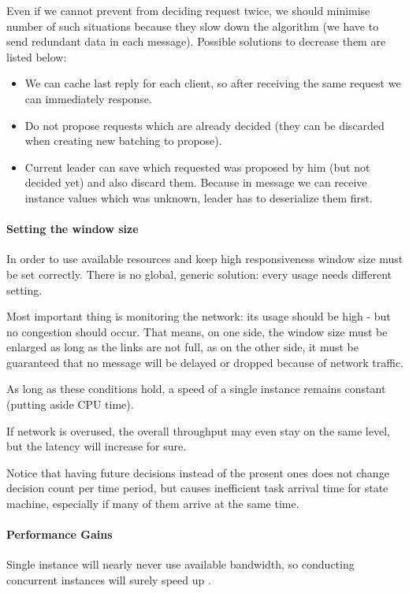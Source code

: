 Even if we cannot prevent from deciding request twice, we should minimise number of such situations because they slow down the algorithm (we have to send redundant data in each message). Possible solutions to decrease them are listed below:
\begin{itemize}
  \item We can cache last reply for each client, so after receiving the same request we can immediately response.
  \item Do not propose requests which are already decided (they can be discarded when creating new batching to propose). 
  \item Current leader can save which requested was proposed by him (but not decided yet) and also discard them. Because in \prepareOK message we can receive instance values which was unknown, leader has to deserialize them first.
\end{itemize}

\paragraph{Setting the window size}
In order to use available resources and keep high responsiveness window size must be set correctly. There is no global, generic solution: every usage needs different setting.

Most important thing is monitoring the network: its usage should be high - but no congestion should occur.
That means, on one side, the window size must be enlarged as long as the links are not full, as on the other side, it must be guaranteed that no message will be delayed or dropped because of network traffic.

As long as these conditions hold, a speed of a single instance remains constant (putting aside CPU time).

If network is overused, the overall throughput may even stay on the same level, but the latency will increase for sure.

Notice that having future decisions instead of the present ones does not change decision count per time period, but causes inefficient task arrival time for state machine, especially if many of them arrive at the same time.

\paragraph{Performance Gains}
Single instance will nearly never use available bandwidth, so conducting concurrent instances will surely speed up \paxosJava.

